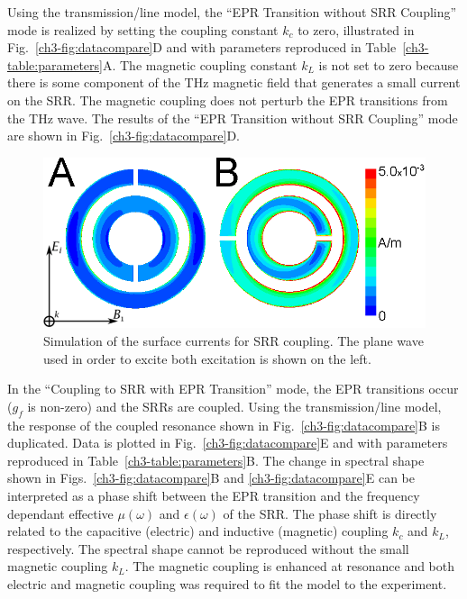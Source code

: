 Using the transmission\-/line model, the ``EPR Transition without SRR Coupling'' mode is realized by setting the coupling constant $k_c$ to zero, illustrated in Fig.~\ref{ch3-fig:datacompare}D and with parameters reproduced in Table~\ref{ch3-table:parameters}A. The magnetic coupling constant $k_L$ is not set to zero because there is some component of the THz magnetic field that generates a small current on the SRR. The magnetic coupling does not perturb the EPR transitions from the THz wave. The results of the ``EPR Transition without SRR Coupling'' mode are shown in Fig.~\ref{ch3-fig:datacompare}D.

\begin{figure}[h]\centering
  \includegraphics{Kapitel/Ch3-Images/SurfaceCurrent-THz.eps}%
  \caption[Simulation of the surface currents for SRR coupling.]{Simulation of the surface currents for SRR coupling. The plane wave used in order to excite both excitation is shown on the left.}  \label{ch3-fig:surfacecurrent}
\end{figure}

In the ``Coupling to SRR with EPR Transition'' mode, the EPR transitions occur ($g_f$ is non-zero) and the SRRs are coupled. Using the transmission\-/line model, the response of the coupled resonance shown in Fig.~\ref{ch3-fig:datacompare}B is duplicated. Data is plotted in Fig.~\ref{ch3-fig:datacompare}E and with parameters reproduced in Table~\ref{ch3-table:parameters}B. The change in spectral shape shown in Figs.~\ref{ch3-fig:datacompare}B and \ref{ch3-fig:datacompare}E can be interpreted as a phase shift between the EPR transition and the frequency dependant effective $\mu(\omega)$ and $\epsilon(\omega)$ of the SRR. The phase shift is directly related to the capacitive (electric) and inductive (magnetic) coupling $k_c$ and $k_L$, respectively. The spectral shape cannot be reproduced without the small magnetic coupling $k_L$. The magnetic coupling is enhanced at resonance and both electric and magnetic coupling was required to fit the model to the experiment.

